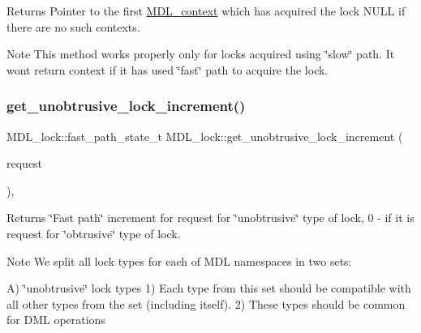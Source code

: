 \begin{DoxyReturn}{Returns}
Pointer to the first \mbox{\hyperlink{classMDL__context}{M\+D\+L\+\_\+context}} which has acquired the lock N\+U\+LL if there are no such contexts.
\end{DoxyReturn}
\begin{DoxyNote}{Note}
This method works properly only for locks acquired using \char`\"{}slow\char`\"{} path. It won\textquotesingle{}t return context if it has used \char`\"{}fast\char`\"{} path to acquire the lock. 
\end{DoxyNote}
\mbox{\label{classMDL__lock_aa8424d2f478663117e7ac5e435840342}} 
\subsubsection{\texorpdfstring{get\+\_\+unobtrusive\+\_\+lock\+\_\+increment()}{get\_unobtrusive\_lock\_increment()}\hspace{0.1cm}{\footnotesize\ttfamily [1/2]}}
{\footnotesize\ttfamily M\+D\+L\+\_\+lock\+::fast\+\_\+path\+\_\+state\+\_\+t M\+D\+L\+\_\+lock\+::get\+\_\+unobtrusive\+\_\+lock\+\_\+increment (\begin{DoxyParamCaption}\item[{const \mbox{\hyperlink{classMDL__request}{M\+D\+L\+\_\+request}} $\ast$}]{request }\end{DoxyParamCaption})\hspace{0.3cm}{\ttfamily [inline]}, {\ttfamily [static]}}

\begin{DoxyReturn}{Returns}
\char`\"{}\+Fast path\char`\"{} increment for request for \char`\"{}unobtrusive\char`\"{} type of lock, 0 -\/ if it is request for \char`\"{}obtrusive\char`\"{} type of lock.
\end{DoxyReturn}
\begin{DoxyNote}{Note}
We split all lock types for each of M\+DL namespaces in two sets\+:
\end{DoxyNote}
A) \char`\"{}unobtrusive\char`\"{} lock types 1) Each type from this set should be compatible with all other types from the set (including itself). 2) These types should be common for D\+ML operations

